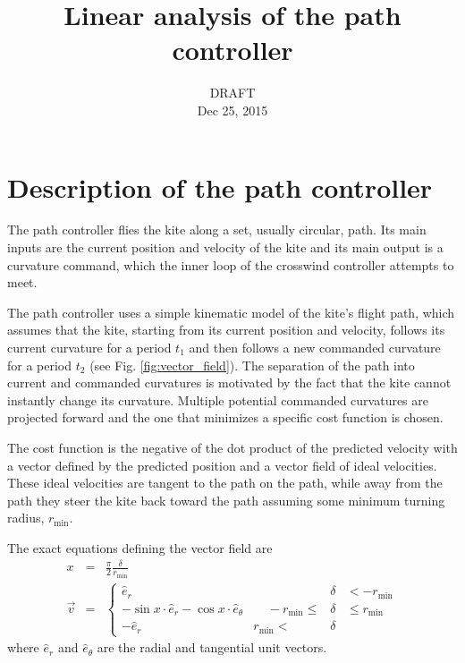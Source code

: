 \documentclass{article} %
\title{Linear analysis of the path controller}
\date{DRAFT\\Dec 25, 2015}
\begin{document}
\maketitle

\section{Description of the path controller}

The path controller flies the kite along a set, usually circular,
path.  Its main inputs are the current position and velocity of the
kite and its main output is a curvature command, which the inner loop
of the crosswind controller attempts to meet.

The path controller uses a simple kinematic model of the kite's flight
path, which assumes that the kite, starting from its current position
and velocity, follows its current curvature for a period $t_1$ and
then follows a new commanded curvature for a period $t_2$ (see
Fig. \ref{fig:vector_field}).  The separation of the path into current
and commanded curvatures is motivated by the fact that the kite cannot
instantly change its curvature.  Multiple potential commanded
curvatures are projected forward and the one that minimizes a specific
cost function is chosen.

The cost function is the negative of the dot product of the predicted
velocity with a vector defined by the predicted position and a vector
field of ideal velocities.  These ideal velocities are tangent to the
path on the path, while away from the path they steer the kite back
toward the path assuming some minimum turning radius,
$r_{\mathrm{min}}$.

The exact equations defining the vector field are
\begin{eqnarray}
x &=& \frac{\pi}{2} \frac{\delta}{r_{\mathrm{min}}} \\
\vec{v} &=&\left\{
\begin{array}{lrcl}
\hat{e}_r  &                      &\delta& <  -r_{\mathrm{min}} \\
-\sin x \cdot \hat{e}_r - \cos x \cdot \hat{e}_{\theta}
  &\;\;\;\; -r_{\mathrm{min}} \le &\delta& \le r_{\mathrm{min}} \\
-\hat{e}_r & r_{\mathrm{min}} <   &\delta&
\end{array}
\right.
\end{eqnarray}
where $\hat{e}_r$ and $\hat{e}_{\theta}$ are the radial and tangential
unit vectors.
\end{document}

